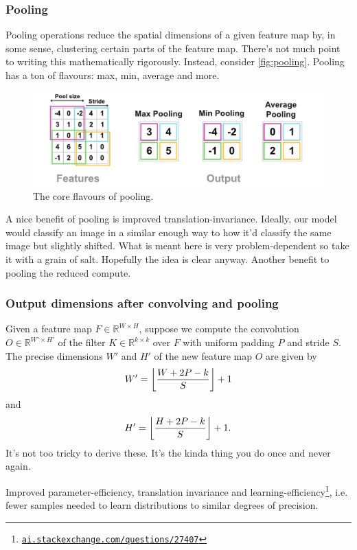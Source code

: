 \documentclass[11pt]{article}
\begin{document}
\subsubsection{Pooling}
Pooling operations reduce the spatial dimensions of a given feature map by, in some sense, clustering certain parts of the feature map. There's not much point to writing this mathematically rigorously. Instead, consider \autoref{fig:pooling}. Pooling has a ton of flavours: max, min, average and more.

\begin{figure}[ht]
    \centering
    \includegraphics[width=1\textwidth]{./figures/neural_nets/CNN_pooling.pdf}
    \caption{The core flavours of pooling. }
    \label{fig:pooling}
\end{figure}

A nice benefit of pooling is improved translation-invariance. Ideally, our model would classify an image in a similar enough way to how it'd classify the same image but slightly shifted. What is meant here is very problem-dependent so take it with a grain of salt. Hopefully the idea is clear anyway. Another benefit to pooling the reduced compute.

\subsubsection{Output dimensions after convolving and pooling}
Given a feature map $F\in\mathbb{R}^{W\times H}$, suppose we compute the convolution $O\in\mathbb{R}^{W'\times H'}$ of the filter $K\in\mathbb{R}^{k\times k}$ over $F$ with uniform padding $P$ and stride $S$. The precise dimensions $W'$ and $H'$ of the new feature map $O$ are given by
$$
W'
=
\left\lfloor
\frac{W+2P-k}{S}
\right\rfloor
+1
$$
and
$$
H'
=
\left\lfloor
\frac{H+2P-k}{S}
\right\rfloor
+1.
$$
It's not too tricky to derive these. It's the kinda thing you do once and never again. 

\begin{tcolorbox}[title={\centering\textbf{Why use a CNN over an MLP?}}, colback=myLightBlue, colbacktitle=myDarkBlue, colframe=myDarkBlue, coltitle=white]
    Improved parameter-efficiency, translation invariance and learning-efficiency\footnote{\href{https://ai.stackexchange.com/questions/27407/what-does-statistical-efficiency-mean-in-this-context}{\texttt{ai.stackexchange.com/questions/27407}}}, i.e. fewer samples needed to learn distributions to similar degrees of precision.
\end{tcolorbox}
\end{document}
